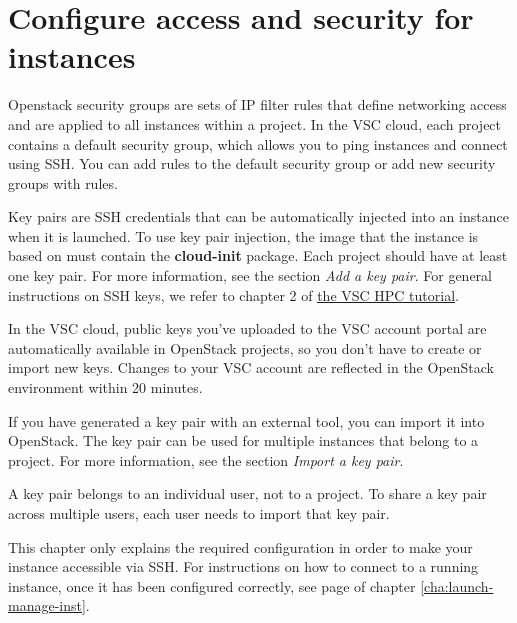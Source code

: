 \chapter{Configure access and security for instances}
Openstack security groups are sets of IP filter rules that define
networking access and are applied to all instances within a project.
In the VSC cloud, each project contains a default security group,
which allows you to ping instances and connect using SSH.  You can add
rules to the default security group or add new security groups with
rules.

Key pairs are SSH credentials that can be automatically injected into
an instance when it is launched. To use key pair injection, the image
that the instance is based on must contain the \textbf{cloud-init}
package. Each project should have at least one key pair. For more
information, see the section \emph{Add a key pair}.  For general
instructions on SSH keys, we refer to chapter 2 of
\href{https://www.vscentrum.be/support/tut-book/vsc-tutorials}{the VSC
  HPC tutorial}.

 In the VSC cloud, public keys you've uploaded to the
VSC account portal are automatically available in OpenStack projects,
so you don't have to create or import new keys.  Changes to your VSC
account are reflected in the OpenStack environment within 20 minutes.

If you have generated a key pair with an external tool, you can import
it into \gls{OpenStack}. The key pair can be used for multiple
instances that belong to a project. For more information, see the
section \emph{Import a key pair}.

 A key pair belongs to an individual user, not to a
project. To share a key pair across multiple users, each user needs to
import that key pair.

 This chapter only explains the required configuration
in order to make your instance accessible via SSH.  For instructions
on how to connect to a running instance, once it has been configured
correctly, see page \pageref{connect-to-your-instance-using-ssh} of
chapter \ref{cha:launch-manage-inst}.

